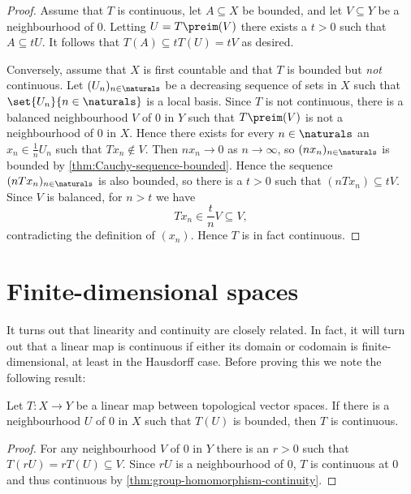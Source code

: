 \documentclass[article, a4paper, 11pt, oneside]{memoir}
\numberwithin{equation}{chapter}
\begin{document}
\begin{proof}
    Assume that $T$ is continuous, let $A \subseteq X$ be bounded, and let $V \subseteq Y$ be a neighbourhood of $0$. Letting $U = T\preim(V)$ there exists a $t > 0$ such that $A \subseteq tU$. It follows that $T(A) \subseteq tT(U) = tV$ as desired.

    Conversely, assume that $X$ is first countable and that $T$ is bounded but \emph{not} continuous. Let $(U_n)_{n \in \naturals}$ be a decreasing sequence of sets in $X$ such that $\set{U_n}{n \in \naturals}$ is a local basis. Since $T$ is not continuous, there is a balanced neighbourhood $V$ of $0$ in $Y$ such that $T\preim(V)$ is not a neighbourhood of $0$ in $X$. Hence there exists for every $n \in \naturals$ an $x_n \in \frac{1}{n} U_n$ such that $Tx_n \not\in V$. Then $nx_n \to 0$ as $n \to \infty$, so $(nx_n)_{n \in \naturals}$ is bounded by \cref{thm:Cauchy-sequence-bounded}. Hence the sequence $(nTx_n)_{n \in \naturals}$ is also bounded, so there is a $t > 0$ such that $(nTx_n) \subseteq tV$. Since $V$ is balanced, for $n > t$ we have
    \begin{equation*}
        Tx_n
            \in \frac{t}{n} V
            \subseteq V,
    \end{equation*}
    contradicting the definition of $(x_n)$. Hence $T$ is in fact continuous.
\end{proof}


\section{Finite-dimensional spaces}

It turns out that linearity and continuity are closely related. In fact, it will turn out that a linear map is continuous if either its domain or codomain is finite-dimensional, at least in the Hausdorff case. Before proving this we note the following result:

\begin{lemma}
    \label{thm:bounded-around-0-implies-continuous}
    Let $T \colon X \to Y$ be a linear map between topological vector spaces. If there is a neighbourhood $U$ of $0$ in $X$ such that $T(U)$ is bounded, then $T$ is continuous.
\end{lemma}

\begin{proof}
    For any neighbourhood $V$ of $0$ in $Y$ there is an $r > 0$ such that $T(rU) = rT(U) \subseteq V$. Since $rU$ is a neighbourhood of $0$, $T$ is continuous at $0$ and thus continuous by \cref{thm:group-homomorphism-continuity}.
\end{proof}
\end{document}
